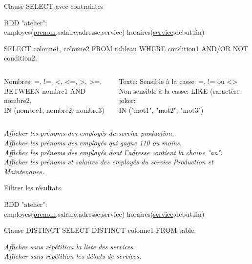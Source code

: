 \documentclass[xetex,dvipsnames]{beamer}
\begin{document}
\begin{frame}[t]{Clause SELECT avec contraintes}
\begin{small}
		BDD "atelier": \\employes(\underline{prenom},salaire,adresse,service) horaires(\underline{service},debut,fin)
\end{small}	\begin{alertblock}{}
		SELECT colonne1, colonne2 FROM tableau WHERE condition1 AND/OR NOT condition2;
	\end{alertblock}
	
\begin{footnotesize}
 \begin{columns}
    \begin{column}{0.5\textwidth}
	\begin{block}{Nombres:}
		=, !=, <, <=, >, >=,
		\\BETWEEN nombre1 AND nombre2,
		\\IN (nombre1, nombre2, nombre3)
	\end{block}
	    \end{column}
	    \begin{column}{0.5\textwidth}
		\begin{block}{Texte:}
Sensible à la casse: =, != ou <> 
\\Non sensible à la casse: LIKE (caractère joker: %
\\IN ("mot1", "mot2", "mot3")
	\end{block}
		    \end{column}
	    \end{columns}

\end{footnotesize}
		\textit{Afficher les prénoms des employés du service production.}\\
		\textit{Afficher les prénoms des employés qui gagne 110 ou moins.}\\
		\textit{Afficher les prénoms des employés dont l'adresse contient la chaine "an".}\\
		\textit{Afficher les prénoms et salaires des employés du service Production et Maintenance.}\\
\end{frame}


\begin{frame}[t]{Filtrer les résultats}
\begin{small}
		BDD "atelier": \\employes(\underline{prenom},salaire,adresse,service) horaires(\underline{service},debut,fin)
\end{small}	
	\begin{alertblock}{Clause DISTINCT}
		SELECT DISTINCT colonne1 FROM table;
	\end{alertblock}
	
		\textit{Afficher sans répétition la liste des services.}\\
		\textit{Afficher sans répétition les débuts de services.}\\
\end{frame}
\end{document}
